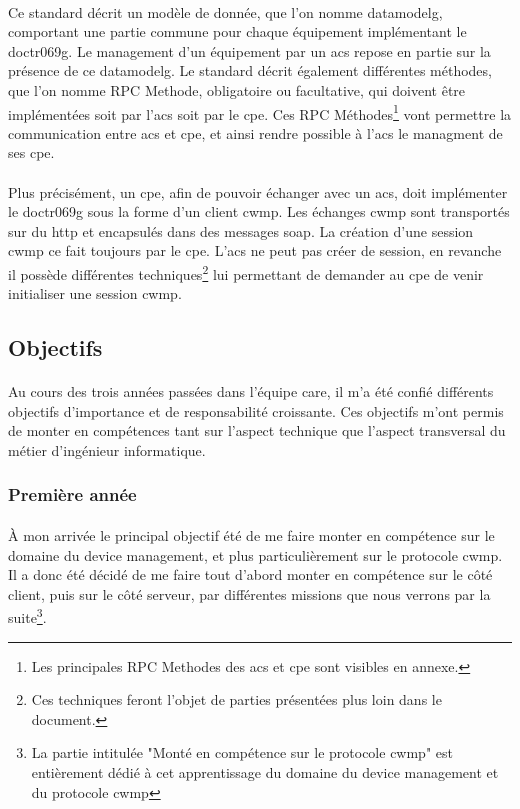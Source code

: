 \documentclass[12pt,a4paper]{report}
\begin{document}
\paragraph*{}Ce standard décrit un modèle de donnée, que l'on nomme \gls{datamodelg}, comportant une partie commune pour chaque équipement implémentant le \gls{doctr069g}. Le management d'un équipement par un \gls{acs} repose en partie sur la présence de ce \gls{datamodelg}. Le standard décrit également différentes méthodes, que l'on nomme RPC Methode, obligatoire ou facultative, qui doivent être implémentées soit par l'\gls{acs} soit par le \gls{cpe}. Ces RPC Méthodes\footnote{Les principales RPC Methodes des \gls{acs} et \gls{cpe} sont visibles en annexe.} vont permettre la communication entre \gls{acs} et \gls{cpe}, et ainsi rendre possible à l'\gls{acs} le managment de ses \gls{cpe}.
\paragraph*{}Plus précisément, un \gls{cpe}, afin de pouvoir échanger avec un \gls{acs}, doit implémenter le \gls{doctr069g} sous la forme d'un client \gls{cwmp}. Les échanges \gls{cwmp} sont transportés sur du \gls{http} et encapsulés dans des messages \gls{soap}. La création d'une session \gls{cwmp} ce fait toujours par le \gls{cpe}. L'\gls{acs} ne peut pas créer de session, en revanche il possède différentes techniques\footnote{Ces techniques feront l'objet de parties présentées plus loin dans le document.} lui permettant de demander au \gls{cpe} de venir initialiser une session \gls{cwmp}. \\

\subsection{Objectifs}
\paragraph*{}Au cours des trois années passées dans l'équipe \gls{care}, il m'a été confié différents objectifs d'importance et de responsabilité croissante. Ces objectifs m'ont permis de monter en compétences tant sur l'aspect technique que l'aspect transversal du métier d'ingénieur informatique.\\
\subsubsection{Première année}
\paragraph*{}À mon arrivée le principal objectif été de me faire monter en compétence sur le domaine du device management, et plus particulièrement sur le protocole \gls{cwmp}. Il a donc été décidé de me faire tout d'abord monter en compétence sur le côté client, puis sur le côté serveur, par différentes missions que nous verrons par la suite\footnote{La partie intitulée "Monté en compétence sur le protocole \gls{cwmp}" est entièrement dédié à cet apprentissage du domaine du device management et du protocole \gls{cwmp}}. \\
\end{document}
